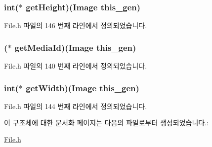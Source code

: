 \hypertarget{struct___image_a8958794ba1906035ca256305dc103399}{
\subsubsection[{get\-Height}]{\setlength{\rightskip}{0pt plus 5cm}int($\ast$  get\-Height)({\bf Image} this\-\_\-gen)}}\label{struct___image_a8958794ba1906035ca256305dc103399}


File.\-h 파일의 146 번째 라인에서 정의되었습니다.

\hypertarget{struct___image_a3ebc4a1fcad891955f6bd315dbf79b87}{
\subsubsection[{get\-Media\-Id}]{($\ast$  get\-Media\-Id)({\bf Image} this\-\_\-gen)}}\label{struct___image_a3ebc4a1fcad891955f6bd315dbf79b87}


File.\-h 파일의 140 번째 라인에서 정의되었습니다.

\hypertarget{struct___image_ac1af259a21d8c67dab2729dc2ca8e6ab}{
\subsubsection[{get\-Width}]{\setlength{\rightskip}{0pt plus 5cm}int($\ast$  get\-Width)({\bf Image} this\-\_\-gen)}}\label{struct___image_ac1af259a21d8c67dab2729dc2ca8e6ab}


File.\-h 파일의 144 번째 라인에서 정의되었습니다.



이 구조체에 대한 문서화 페이지는 다음의 파일로부터 생성되었습니다.\-:\begin{DoxyCompactItemize}
\item 
\hyperlink{_file_8h}{File.\-h}\end{DoxyCompactItemize}

